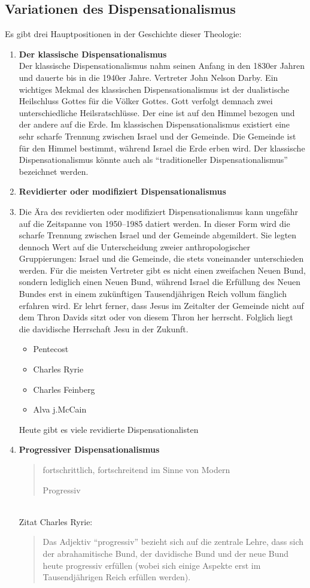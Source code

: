 \documentclass{mybib}
\begin{document}
\subsection{Variationen des Dispensationalismus}
Es gibt drei Hauptpositionen in der Geschichte dieser Theologie:
\begin{enumerate}
    \item \textbf{Der klassische Dispensationalismus}\\
    Der klassische Dispensationalismus nahm seinen Anfang in den 1830er Jahren und dauerte bis in die 1940er Jahre. Vertreter John Nelson Darby. Ein wichtiges Mekmal des klassischen Dispensationalismus ist der dualistische Heilschluss Gottes für die Völker Gottes. Gott verfolgt demnach zwei unterschiedliche Heilsratschlüsse. Der eine ist auf den Himmel bezogen und der andere auf die Erde. Im klassischen Dispensationalismus existiert eine sehr scharfe Trennung zwischen Israel und der Gemeinde. Die Gemeinde ist für den Himmel bestimmt, während Israel die Erde erben wird. Der klassische Dispensationalismus könnte auch als \enquote{traditioneller Dispensationalismus} bezeichnet werden.
    \item \textbf{Revidierter oder modifiziert Dispensationalismus}\\
    \item Die Ära des revidierten oder modifiziert Dispensationalismus kann ungefähr auf die Zeitspanne von 1950--1985 datiert werden. In dieser Form wird die scharfe Trennung zwischen Israel und der Gemeinde abgemildert. Sie legten dennoch Wert auf die Unterscheidung zweier anthropologischer Gruppierungen: Israel und die Gemeinde, die stets voneinander unterschieden werden. Für die meisten Vertreter gibt es nicht einen zweifachen Neuen Bund, sondern lediglich einen Neuen Bund, während Israel die Erfüllung des Neuen Bundes erst in einem zukünftigen Tausendjährigen Reich vollum
    fänglich erfahren wird. Er lehrt ferner, dass Jesus im Zeitalter der Gemeinde nicht auf dem Thron Davids sitzt oder von diesem Thron her herrscht. Folglich liegt die davidische Herrschaft Jesu in der Zukunft.     
    \begin{itemize}    
        \item Pentecost        
        \item Charles Ryrie
        \item Charles Feinberg
        \item Alva j.McCain
    \end{itemize}    
    Heute gibt es viele revidierte Dispensationalisten
    \item \textbf{Progressiver Dispensationalismus} \blockquote[Progressiv]{fortschrittlich, fortschreitend im Sinne von Modern}\\
    Zitat Charles Ryrie: \blockquote{Das Adjektiv \enquote{progressiv} bezieht sich auf die zentrale Lehre, dass sich der abrahamitische Bund, der davidische Bund und der neue Bund heute progressiv erfüllen (wobei sich einige Aspekte erst im Tausendjährigen Reich erfüllen werden).} 
    

\end{enumerate}
\end{document}
